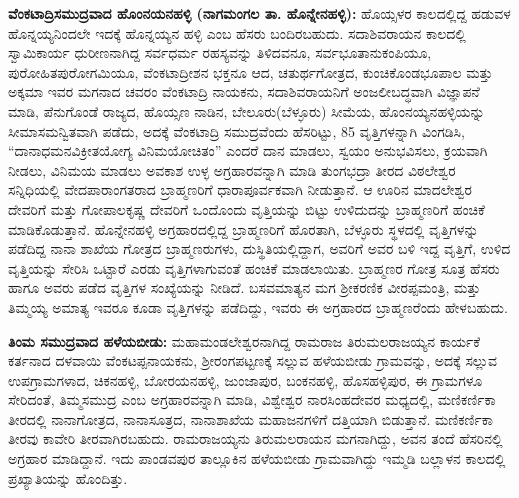 \textbf{ವೆಂಕಟಾದ್ರಿಸಮುದ್ರವಾದ ಹೊಂನಯನಹಳ್ಳಿ (ನಾಗಮಂಗಲ ತಾ. ಹೊನ್ನೇನಹಳ್ಳಿ):} ಹೊಯ್ಸಳರ ಕಾಲದಲ್ಲಿದ್ದ ಹಡುವಳ ಹೊನ್ನಯ್ಯ\-ನಿಂದಲೇ ಇದಕ್ಕೆ ಹೊನ್ನಯ್ಯನ ಹಳ್ಳಿ ಎಂಬ ಹೆಸರು ಬಂದಿರಬಹುದು. ಸದಾಶಿವರಾಯನ ಕಾಲದಲ್ಲಿ ಸ್ವಾಮಿಕಾರ್ಯ ಧುರೀಣನಾಗಿದ್ದ ಸರ್ವಧರ್ಮ ರಹಸ್ಯವನ್ನು ತಿಳಿದವನೂ, ಸರ್ವಭೂತಾನುಕಂಪಿಯೂ, ಪುರೋಹಿತ\break ಪುರೋಗಮಿಯೂ, ವೆಂಕಟಾದ್ರೀಶನ ಭಕ್ತನೂ ಆದ, ಚತುರ್ಥಗೋತ್ರದ, ಕುಂಚಿಕೊಂಡಭೂಪಾಲ ಮತ್ತು ಅಕ್ಕಮಾ ಇವರ ಮಗನಾದ ಚವರಂ ವೆಂಕಟಾದ್ರಿ ನಾಯಕನು, ಸದಾಶಿವರಾಯನಿಗೆ ಅಂಜಲೀಬದ್ಧವಾಗಿ ವಿಜ್ಞಾಪನೆ ಮಾಡಿ, ಪೆನುಗೊಂಡೆ ರಾಜ್ಯದ, ಹೊಯ್ಸಣ ನಾಡಿನ, ಬೇಲೂರು(ಬೆಳ್ಳೂರು) ಸೀಮೆಯ, ಹೊಂನಯ್ಯನಹಳ್ಳಿಯನ್ನು ಸೀಮಾಸಮನ್ವಿತವಾಗಿ ಪಡೆದು, ಅದಕ್ಕೆ ವೆಂಕಟಾದ್ರಿ ಸಮುದ್ರವೆಂದು ಹೆಸರಿಟ್ಟು, 85 ವೃತ್ತಿಗಳನ್ನಾಗಿ ವಿಂಗಡಿಸಿ, “ದಾನಾಧಮನವಿಕ್ರೀತಯೋಗ್ಯ ವಿನಿಮಯೋ\-ಚಿತಂ” ಎಂದರೆ ದಾನ ಮಾಡಲು, ಸ್ವಯಂ ಅನುಭವಿಸಲು, ಕ್ರಯವಾಗಿ ನೀಡಲು, ವಿನಿಮಯ ಮಾಡಲು ಅವಕಾಶ ಉಳ್ಳ ಅಗ್ರಹಾರವನ್ನಾಗಿ ಮಾಡಿ ತುಂಗಭದ್ರಾ ತೀರದ ವಿಠಲೇಶ್ವರ ಸನ್ನಿಧಿಯಲ್ಲಿ ವೇದಪಾರಾಂಗತರಾದ ಬ್ರಾಹ್ಮಣರಿಗೆ ಧಾರಾಪೂರ್ವಕ\-ವಾಗಿ ನೀಡುತ್ತಾನೆ. ಆ ಊರಿನ ಮಾದಲೇಶ್ವರ ದೇವರಿಗೆ ಮತ್ತು ಗೋಪಾಲಕೃಷ್ಣ ದೇವರಿಗೆ ಒಂದೊಂದು ವೃತ್ತಿಯನ್ನು ಬಿಟ್ಟು ಉಳಿದುದನ್ನು ಬ್ರಾಹ್ಮಣರಿಗೆ ಹಂಚಿಕೆ ಮಾಡಿಕೊಡುತ್ತಾನೆ. ಹೊನ್ನೇನಹಳ್ಳಿ ಅಗ್ರಹಾರದಲ್ಲಿದ್ದ ಬ್ರಾಹ್ಮಣರಿಗೆ ಹೊರತಾಗಿ, ಬೆಳ್ಳೂರು ಸ್ಥಳದಲ್ಲಿ ವೃತ್ತಿಗಳನ್ನು ಪಡೆದಿದ್ದ ನಾನಾ ಶಾಖೆಯ ಗೋತ್ರದ ಬ್ರಾಹ್ಮಣರುಗಳು, ದುಸ್ಥಿತಿಯಲ್ಲಿದ್ದಾಗ, ಅವರಿಗೆ ಅವರ ಬಳಿ ಇದ್ದ ವೃತ್ತಿಗೆ, ಉಳಿದ ವೃತ್ತಿಯನ್ನು ಸೇರಿಸಿ ಒಟ್ಟಾರೆ ಎರಡು ವೃತ್ತಿಗಳಾಗುವಂತೆ ಹಂಚಿಕೆ ಮಾಡಲಾಯಿತು. ಬ್ರಾಹ್ಮಣರ ಗೋತ್ರ ಸೂತ್ರ ಹೆಸರು ಹಾಗೂ ಅವರು ಪಡೆದ ವೃತ್ತಿಗಳ ಸಂಖ್ಯೆಯನ್ನು ನೀಡಿದೆ. ಬಸವಮಾತ್ಯನ ಮಗ ಶ‍್ರೀಕರಣಿಕ ವೀರಪ್ಪಮಂತ್ರಿ, ಮತ್ತು ತಿಮ್ಮಯ್ಯ ಅಮಾತ್ಯ ಇವರೂ ಕೂಡಾ ವೃತ್ತಿಗಳನ್ನು ಪಡೆದಿದ್ದು, ಇವರು ಈ ಅಗ್ರಹಾರದ ಬ್ರಾಹ್ಮಣರೆಂದು ಹೇಳಬಹುದು.

\textbf{ತಿಂಮ ಸಮುದ್ರವಾದ ಹಳೆಯಬೀಡು: } ಮಹಾಮಂಡಲೇಶ್ವರನಾಗಿದ್ದ ರಾಮರಾಜ ತಿರುಮಲರಾಜಯ್ಯನ ಕಾರ್ಯಕೆ ಕರ್ತನಾದ ದಳವಾಯಿ ವೆಂಕಟಪ್ಪನಾಯಕನು, ಶ‍್ರೀರಂಗಪಟ್ಟಣಕ್ಕೆ ಸಲ್ಲುವ ಹಳೆಯಬೀಡು ಗ್ರಾಮವನ್ನು, ಅದಕ್ಕೆ ಸಲ್ಲುವ ಉಪಗ್ರಾಮಗಳಾದ, ಚಿಕನಹಳ್ಳಿ, ಬೋರಯನಹಳ್ಳಿ, ಜುಂಜಾಪುರ, ಬಂಕನಹಳ್ಳಿ, ಹೊಸಹಳ್ಳಿಪುರ, ಈ ಗ್ರಾಮಗಳೂ ಸೇರಿದಂತೆ, ತಿಮ್ಮಸಮುದ್ರ ಎಂಬ ಅಗ್ರಹಾರವನ್ನಾಗಿ ಮಾಡಿ, ವಿಶ್ವೇಶ್ವರ ನಾರಸಿಂಹದೇವರ ಮಧ್ಯದಲ್ಲಿ, ಮಣಿಕರ್ಣಿಕಾ ತೀರದಲ್ಲಿ ನಾನಾಗೋತ್ರದ, ನಾನಾಸೂತ್ರದ, ನಾನಾಶಾಖೆಯ ಮಹಾಜನಗಳಿಗೆ ದತ್ತಿಯಾಗಿ ಬಿಡುತ್ತಾನೆ. ಮಣಿಕರ್ಣಿಕಾ ತೀರವು ಕಾವೇರಿ ತೀರವಾಗಿರಬಹುದು. ರಾಮರಾಜಯ್ಯನು ತಿರುಮಲರಾಯನ ಮಗನಾಗಿದ್ದು, ಅವನ ತಂದೆ ಹೆಸರಿನಲ್ಲಿ ಅಗ್ರಹಾರ ಮಾಡಿದ್ದಾನೆ. ಇದು ಪಾಂಡವಪುರ ತಾಲ್ಲೂಕಿನ ಹಳೆಯಬೀಡು ಗ್ರಾಮವಾಗಿದ್ದು ಇಮ್ಮಡಿ ಬಲ್ಲಾಳನ ಕಾಲದಲ್ಲಿ ಪ್ರಖ್ಯಾತಿಯನ್ನು ಹೊಂದಿತ್ತು.

